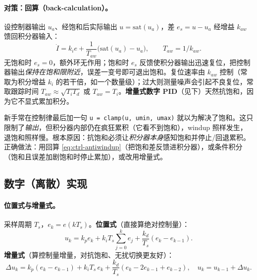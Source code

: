 \paragraph{对策：回算（back-calculation）。}
设控制器输出 $u_a$、经饱和后实际输出 $u=\mathrm{sat}(u_a)$，差 $e_s=u-u_a$ 经增益 $k_{aw}$ 馈回积分器输入\cite{astrom2008feedback,khalil2002nonlinear}：
\begin{equation}
  \dot I=k_ie+\frac{1}{T_{aw}}\big(\mathrm{sat}(u_a)-u_a\big),\qquad T_{aw}=1/k_{aw}.
  \label{eq:ctrl-antiwindup}
\end{equation}
无饱和时 $e_s=0$，额外环无作用；饱和时 $e_s$ 反馈使积分器输出迅速复位，把控制器输出\emph{保持在饱和限附近}，误差一变号即可退出饱和。复位速率由 $k_{aw}$ 控制（常取为积分增益 $k_i$ 的若干倍，如一个数量级）；过大则测量噪声会引起不良复位，常取跟踪时间 $T_{aw}\approx\sqrt{T_iT_d}$ 或 $T_{aw}=T_i$。\textbf{增量式数字 PID}（见下）天然抗饱和，因为它不显式累加积分。

\begin{pitfall}
新手常在控制律最后加一句 \texttt{u = clamp(u, umin, umax)} 就以为解决了饱和。这只限制了\emph{输出}，但积分器内部仍在疯狂累积（它看不到饱和），windup 照样发生，退饱和照样慢。根本原因：抗饱和必须让\emph{积分器本身}感知饱和并停止/回退累积。正确做法：用回算 \cref{eq:ctrl-antiwindup}（把饱和差反馈进积分器），或条件积分（饱和且误差加剧饱和时停止累加），或改用增量式。
\end{pitfall}

\subsection{数字（离散）实现}
\label{sec:ctrl-pid-digital}

\paragraph{位置式与增量式。}
采样周期 $T_s$，$e_k=e(kT_s)$。\textbf{位置式}（直接算绝对控制量）：
\begin{equation}
  u_k=k_pe_k+k_iT_s\sum_{j=0}^{k}e_j+\frac{k_d}{T_s}(e_k-e_{k-1}).
  \label{eq:ctrl-pid-position}
\end{equation}
\textbf{增量式}（算控制量增量，对抗饱和、无扰切换更友好）：
\begin{equation}
  \Delta u_k=k_p(e_k-e_{k-1})+k_iT_s\,e_k+\frac{k_d}{T_s}(e_k-2e_{k-1}+e_{k-2}),\quad u_k=u_{k-1}+\Delta u_k.
  \label{eq:ctrl-pid-velocity}
\end{equation}

